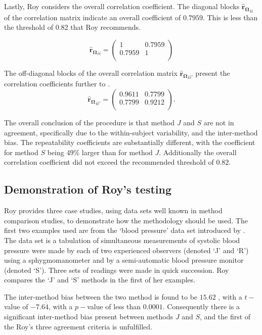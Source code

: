 \documentclass[12pt, a4paper]{report}
\theoremstyle{plain}
\theoremstyle{definition}
\theoremstyle{remark}
\begin{document}
	Lastly, Roy considers the overall correlation coefficient. The diagonal blocks $\boldsymbol{\hat{r}_{\Omega}}_{ii}$ of the correlation matrix indicate an overall coefficient of $0.7959$. This is less than the threshold of 0.82 that Roy recommends.
	
	\[
	\boldsymbol{\hat{r}_{\Omega}}_{ii} = \left( \begin{array}{cc}
	1  & 0.7959  \\
	0.7959  & 1  \\
	\end{array}\right)
	\]
	
	The off-diagonal blocks of the overall correlation matrix $\boldsymbol{\hat{r}_{\Omega}}_{ii'}$ present the correlation coefficients further to \citet{hamlett}.
	\[
	\boldsymbol{\hat{r}_{\Omega}}_{ii'} = \left( \begin{array}{cc}
	0.9611  & 0.7799  \\
	0.7799  & 0.9212  \\
	\end{array}\right).
	\]
	
	The overall conclusion of the procedure is that method $J$ and $S$ are not in agreement, specifically due to the within-subject variability, and the inter-method bias. The repeatability coefficients are substantially different, with the coefficient for method $S$ being 49\% larger than for method $J$. Additionally the overall correlation coefficient did not exceed the recommended threshold of $0.82$.
	


	\subsection{Demonstration of Roy's testing}
	Roy provides three case studies, using data sets well known in method comparison studies, to demonstrate how the methodology should be used. The first two examples used are from the `blood pressure' data set introduced by \citet{BA99}. The data set is a tabulation of simultaneous measurements of systolic blood pressure were made by each of two experienced observers (denoted `J' and `R') using a sphygmomanometer and by a semi-automatic blood pressure monitor (denoted `S'). Three sets of readings were made in quick succession. Roy compares the `J' and `S' methods in the first of her examples.
	
	The inter-method bias between the two method is found to be $15.62$ , with a $t-$value of $-7.64$, with a $p-$value of less than $0.0001$. Consequently there is a significant inter-method bias present between methods $J$ and $S$, and the first of the Roy's three agreement criteria is unfulfilled.
	
\end{document}
